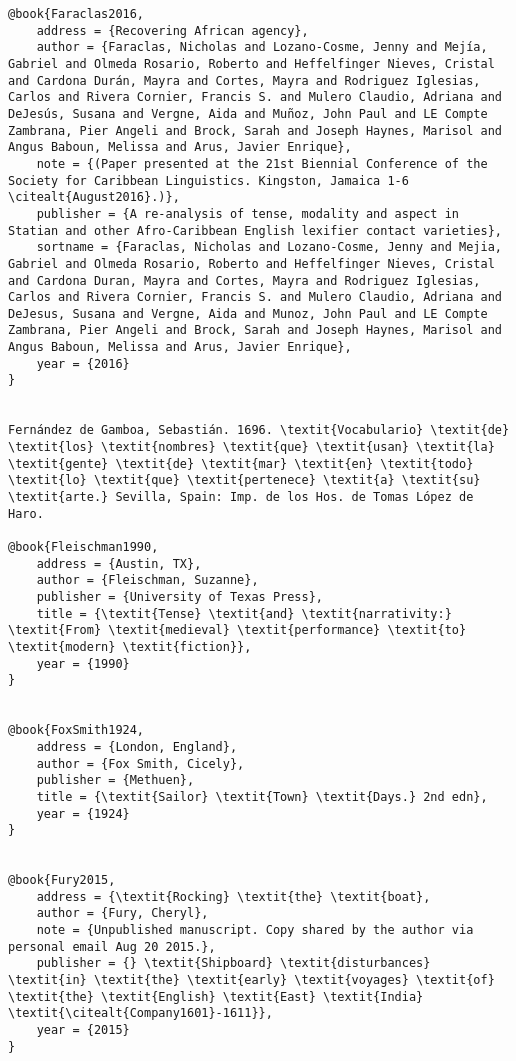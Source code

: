 \begin{verbatim}
@book{Faraclas2016,
	address = {Recovering African agency},
	author = {Faraclas, Nicholas and Lozano-Cosme, Jenny and Mejía, Gabriel and Olmeda Rosario, Roberto and Heffelfinger Nieves, Cristal and Cardona Durán, Mayra and Cortes, Mayra and Rodriguez Iglesias, Carlos and Rivera Cornier, Francis S. and Mulero Claudio, Adriana and DeJesús, Susana and Vergne, Aida and Muñoz, John Paul and LE Compte Zambrana, Pier Angeli and Brock, Sarah and Joseph Haynes, Marisol and Angus Baboun, Melissa and Arus, Javier Enrique},
	note = {(Paper presented at the 21st Biennial Conference of the Society for Caribbean Linguistics. Kingston, Jamaica 1-6 \citealt{August2016}.)},
	publisher = {A re-analysis of tense, modality and aspect in Statian and other Afro-Caribbean English lexifier contact varieties},
	sortname = {Faraclas, Nicholas and Lozano-Cosme, Jenny and Mejia, Gabriel and Olmeda Rosario, Roberto and Heffelfinger Nieves, Cristal and Cardona Duran, Mayra and Cortes, Mayra and Rodriguez Iglesias, Carlos and Rivera Cornier, Francis S. and Mulero Claudio, Adriana and DeJesus, Susana and Vergne, Aida and Munoz, John Paul and LE Compte Zambrana, Pier Angeli and Brock, Sarah and Joseph Haynes, Marisol and Angus Baboun, Melissa and Arus, Javier Enrique},
	year = {2016}
}


Fernández de Gamboa, Sebastián. 1696. \textit{Vocabulario} \textit{de} \textit{los} \textit{nombres} \textit{que} \textit{usan} \textit{la} \textit{gente} \textit{de} \textit{mar} \textit{en} \textit{todo} \textit{lo} \textit{que} \textit{pertenece} \textit{a} \textit{su} \textit{arte.} Sevilla, Spain: Imp. de los Hos. de Tomas López de Haro.

@book{Fleischman1990,
	address = {Austin, TX},
	author = {Fleischman, Suzanne},
	publisher = {University of Texas Press},
	title = {\textit{Tense} \textit{and} \textit{narrativity:} \textit{From} \textit{medieval} \textit{performance} \textit{to} \textit{modern} \textit{fiction}},
	year = {1990}
}


@book{FoxSmith1924,
	address = {London, England},
	author = {Fox Smith, Cicely},
	publisher = {Methuen},
	title = {\textit{Sailor} \textit{Town} \textit{Days.} 2nd edn},
	year = {1924}
}


@book{Fury2015,
	address = {\textit{Rocking} \textit{the} \textit{boat},
	author = {Fury, Cheryl},
	note = {Unpublished manuscript. Copy shared by the author via personal email Aug 20 2015.},
	publisher = {} \textit{Shipboard} \textit{disturbances} \textit{in} \textit{the} \textit{early} \textit{voyages} \textit{of} \textit{the} \textit{English} \textit{East} \textit{India} \textit{\citealt{Company1601}-1611}},
	year = {2015}
}



\end{verbatim}
